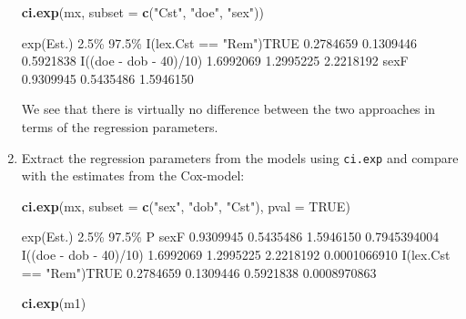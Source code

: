 \documentclass[
]{book}
\newenvironment{Shaded}{\begin{snugshade}}{\end{snugshade}}
\newcommand{\AttributeTok}[1]{\textcolor[rgb]{0.13,0.29,0.53}{#1}}
\newcommand{\ConstantTok}[1]{\textcolor[rgb]{0.56,0.35,0.01}{#1}}
\newcommand{\FunctionTok}[1]{\textcolor[rgb]{0.13,0.29,0.53}{\textbf{#1}}}
\newcommand{\NormalTok}[1]{#1}
\newcommand{\StringTok}[1]{\textcolor[rgb]{0.31,0.60,0.02}{#1}}
\begin{document}
\begin{enumerate}
\begin{Shaded}
\begin{Highlighting}[]
\FunctionTok{ci.exp}\NormalTok{(mx, }\AttributeTok{subset =} \FunctionTok{c}\NormalTok{(}\StringTok{"Cst"}\NormalTok{, }\StringTok{"doe"}\NormalTok{, }\StringTok{"sex"}\NormalTok{))}
\end{Highlighting}
\end{Shaded}

\begin{Shaded}
\begin{Highlighting}[]
\NormalTok{                        exp(Est.)      2.5\%     97.5\%}
\NormalTok{I(lex.Cst == "Rem")TRUE 0.2784659 0.1309446 0.5921838}
\NormalTok{I((doe {-} dob {-} 40)/10)  1.6992069 1.2995225 2.2218192}
\NormalTok{sexF                    0.9309945 0.5435486 1.5946150}
\end{Highlighting}
\end{Shaded}

  We see that there is virtually no difference between the two
  approaches in terms of the regression parameters.
\item
  Extract the regression parameters from the models using
  \texttt{ci.exp} and compare with the estimates from the Cox-model:

\begin{Shaded}
\begin{Highlighting}[]
\FunctionTok{ci.exp}\NormalTok{(mx, }\AttributeTok{subset =} \FunctionTok{c}\NormalTok{(}\StringTok{"sex"}\NormalTok{, }\StringTok{"dob"}\NormalTok{, }\StringTok{"Cst"}\NormalTok{), }\AttributeTok{pval =} \ConstantTok{TRUE}\NormalTok{)}
\end{Highlighting}
\end{Shaded}

\begin{Shaded}
\begin{Highlighting}[]
\NormalTok{                        exp(Est.)      2.5\%     97.5\%            P}
\NormalTok{sexF                    0.9309945 0.5435486 1.5946150 0.7945394004}
\NormalTok{I((doe {-} dob {-} 40)/10)  1.6992069 1.2995225 2.2218192 0.0001066910}
\NormalTok{I(lex.Cst == "Rem")TRUE 0.2784659 0.1309446 0.5921838 0.0008970863}
\end{Highlighting}
\end{Shaded}

\begin{Shaded}
\begin{Highlighting}[]
\FunctionTok{ci.exp}\NormalTok{(m1)}
\end{Highlighting}
\end{Shaded}


\end{enumerate}
\end{document}
